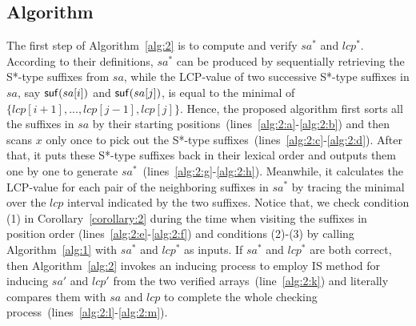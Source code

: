 \documentclass[10pt,journal,compsoc]{IEEEtran}
\begin{document}
\subsection{Algorithm} \label{sec:method2:algorithm}

The first step of Algorithm~\ref{alg:2} is to compute and verify $sa^*$ and $lcp^*$. According to their definitions, $sa^*$ can be produced by sequentially retrieving the S*-type suffixes from $sa$, while the LCP-value of two successive S*-type suffixes in $sa$, say ${\sf suf}(sa[i])$ and ${\sf suf}(sa[j])$, is equal to the minimal of $\{lcp[i + 1], ..., lcp[j - 1], lcp[j]\}$. Hence, the proposed algorithm first sorts all the suffixes in $sa$ by their starting positions~(lines~\ref{alg:2:a}-\ref{alg:2:b}) and then scans $x$ only once to pick out the S*-type suffixes~(lines~\ref{alg:2:c}-\ref{alg:2:d}). After that, it puts these S*-type suffixes back in their lexical order and outputs them one by one to generate $sa^*$~(lines~\ref{alg:2:g}-\ref{alg:2:h}). Meanwhile, it calculates the LCP-value for each pair of the neighboring suffixes in $sa^*$ by tracing the minimal over the $lcp$ interval indicated by the two suffixes. Notice that, we check condition (1) in Corollary~\ref{corollary:2} during the time when visiting the suffixes in position order (lines~\ref{alg:2:e}-\ref{alg:2:f}) and conditions (2)-(3) by calling Algorithm~\ref{alg:1} with $sa^*$ and $lcp^*$ as inputs. If $sa^*$ and $lcp^*$ are both correct, then Algorithm~\ref{alg:2} invokes an inducing process to employ IS method for inducing $sa'$ and $lcp'$ from the two verified arrays~(line~\ref{alg:2:k}) and literally compares them with $sa$ and $lcp$ to complete the whole checking process~(lines~\ref{alg:2:l}-\ref{alg:2:m}).
\end{document}
